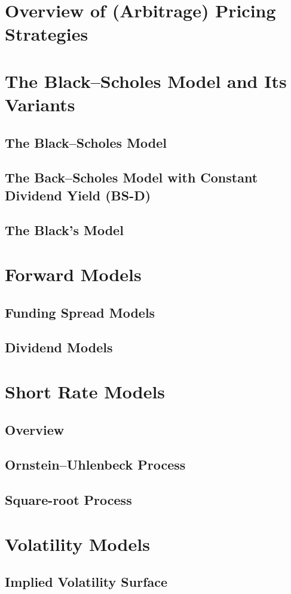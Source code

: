 \documentclass{book}
\begin{document}
\section{Overview of (Arbitrage) Pricing Strategies}
\section{The Black--Scholes Model and Its Variants}
\subsection{The Black--Scholes Model}
\subsection{The Back--Scholes Model with Constant Dividend Yield (BS-D)}
\subsection{The Black's Model}
\section{Forward Models}
\subsection{Funding Spread Models}
\subsection{Dividend Models}
\section{Short Rate Models}
\subsection{Overview}
\subsection{Ornstein--Uhlenbeck Process}
\subsection{Square-root Process}
\section{Volatility Models}
\subsection{Implied Volatility Surface}
\end{document}
